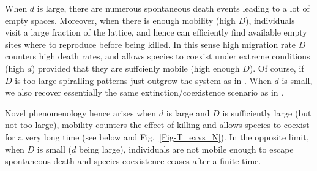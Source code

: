 \documentclass[aps, pre, twocolumn, amsmath, superscriptaddress,showkeys,showpacs]{revtex4-1}
\begin{document}
{{{{ \par 
 When $d$ is large, there are numerous spontaneous death events leading to a lot of empty spaces. Moreover, when there is enough mobility (high $D$), individuals visit a large fraction of the lattice, and hence can efficiently find available  empty sites
 where to  reproduce before being killed. In this sense high migration rate $D$ counters high death rates, and allows species to coexist under extreme conditions (high $d$) provided that they are suffcienly mobile (high enough $D$). Of course, if $D$ is too large spiralling patterns just outgrow the system as in \cite{reichenbach2007mobility}. When $d$ is small, we also recover essentially the same extinction/coexistence scenario as in \cite{reichenbach2007mobility}.
 
%
{	Novel phenomenology hence arises when $d$ is large and $D$ is sufficiently large (but not too large), mobility counters the effect of killing and allows species to coexist for a very long time (see below and Fig.~\ref{Fig-T_exvs_N}). 
	In the opposite limit, when $D$ is small ($d$ being large), individuals are not mobile enough to escape spontaneous death and species coexistence ceases after a finite time.
}
} 


}}}
\end{document}
